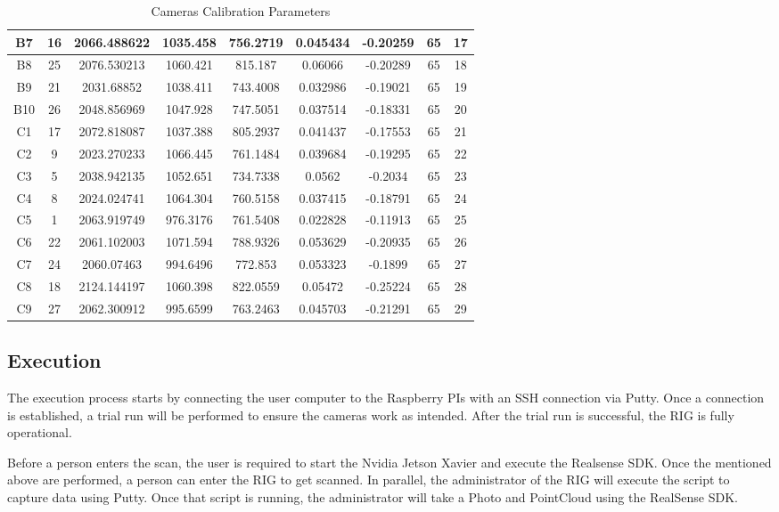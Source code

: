 \documentclass[12pt]{report}
\begin{document}
\begin{table}[H]
{\begin{tabular}{|c|c|c|c|c|c|c|c|c|}
  B7    & 16    & 2066.488622 & 1035.458 & 756.2719 & 0.045434 & -0.20259 & 65 & 17 \\ \hline
  B8    & 25    & 2076.530213 & 1060.421 & 815.187  & 0.06066  & -0.20289 & 65 & 18 \\ \hline
  B9    & 21    & 2031.68852  & 1038.411 & 743.4008 & 0.032986 & -0.19021 & 65 & 19 \\ \hline
  B10   & 26    & 2048.856969 & 1047.928 & 747.5051 & 0.037514 & -0.18331 & 65 & 20 \\ \hline
  C1    & 17    & 2072.818087 & 1037.388 & 805.2937 & 0.041437 & -0.17553 & 65 & 21 \\ \hline
  C2    & 9     & 2023.270233 & 1066.445 & 761.1484 & 0.039684 & -0.19295 & 65 & 22 \\ \hline
  C3    & 5     & 2038.942135 & 1052.651 & 734.7338 & 0.0562   & -0.2034  & 65 & 23 \\ \hline
  C4    & 8     & 2024.024741 & 1064.304 & 760.5158 & 0.037415 & -0.18791 & 65 & 24 \\ \hline
  C5    & 1     & 2063.919749 & 976.3176 & 761.5408 & 0.022828 & -0.11913 & 65 & 25 \\ \hline
  C6    & 22    & 2061.102003 & 1071.594 & 788.9326 & 0.053629 & -0.20935 & 65 & 26 \\ \hline
  C7    & 24    & 2060.07463  & 994.6496 & 772.853  & 0.053323 & -0.1899  & 65 & 27 \\ \hline
  C8    & 18    & 2124.144197 & 1060.398 & 822.0559 & 0.05472  & -0.25224 & 65 & 28 \\ \hline
  C9    & 27    & 2062.300912 & 995.6599 & 763.2463 & 0.045703 & -0.21291 & 65 & 29 \\ \hline
  \end{tabular}%
  }
  \caption{Cameras Calibration Parameters}
  \label{tab:Camera_Calibration}
  \end{table}



  \subsection*{Execution}
  The execution process starts by connecting the user computer to the Raspberry PIs with an SSH connection via Putty.
  Once a connection is established, a trial run will be performed to ensure the cameras work as intended.
  After the trial run is successful, the RIG is fully operational.
  
  Before a person enters the scan, the user is required to start the Nvidia Jetson Xavier and execute the Realsense SDK.
  Once the mentioned above are performed, a person can enter the RIG to get scanned.
  In parallel, the administrator of the RIG will execute the script to capture data using Putty. Once that script is running, the administrator will take a Photo and PointCloud
  using the RealSense SDK. 
  
\end{document}
